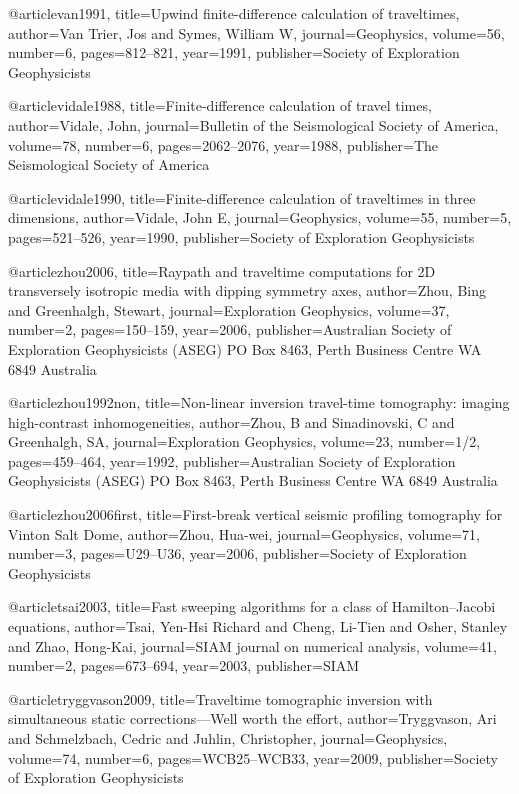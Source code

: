 @article{van1991,
  title={Upwind finite-difference calculation of traveltimes},
  author={Van Trier, Jos and Symes, William W},
  journal={Geophysics},
  volume={56},
  number={6},
  pages={812--821},
  year={1991},
  publisher={Society of Exploration Geophysicists}
}

@article{vidale1988,
  title={Finite-difference calculation of travel times},
  author={Vidale, John},
  journal={Bulletin of the Seismological Society of America},
  volume={78},
  number={6},
  pages={2062--2076},
  year={1988},
  publisher={The Seismological Society of America}
}

@article{vidale1990,
  title={Finite-difference calculation of traveltimes in three dimensions},
  author={Vidale, John E},
  journal={Geophysics},
  volume={55},
  number={5},
  pages={521--526},
  year={1990},
  publisher={Society of Exploration Geophysicists}
}


@article{zhou2006,
  title={Raypath and traveltime computations for 2D transversely isotropic media with dipping symmetry axes},
  author={Zhou, Bing and Greenhalgh, Stewart},
  journal={Exploration Geophysics},
  volume={37},
  number={2},
  pages={150--159},
  year={2006},
  publisher={Australian Society of Exploration Geophysicists (ASEG) PO Box 8463, Perth Business Centre WA 6849 Australia}
}

@article{zhou1992non,
  title={Non-linear inversion travel-time tomography: imaging high-contrast inhomogeneities},
  author={Zhou, B and Sinadinovski, C and Greenhalgh, SA},
  journal={Exploration Geophysics},
  volume={23},
  number={1/2},
  pages={459--464},
  year={1992},
  publisher={Australian Society of Exploration Geophysicists (ASEG) PO Box 8463, Perth Business Centre WA 6849 Australia}
}


@article{zhou2006first,
  title={First-break vertical seismic profiling tomography for Vinton Salt Dome},
  author={Zhou, Hua-wei},
  journal={Geophysics},
  volume={71},
  number={3},
  pages={U29--U36},
  year={2006},
  publisher={Society of Exploration Geophysicists}
}

@article{tsai2003,
  title={Fast sweeping algorithms for a class of Hamilton--Jacobi equations},
  author={Tsai, Yen-Hsi Richard and Cheng, Li-Tien and Osher, Stanley and Zhao, Hong-Kai},
  journal={SIAM journal on numerical analysis},
  volume={41},
  number={2},
  pages={673--694},
  year={2003},
  publisher={SIAM}
}

@article{tryggvason2009,
  title={Traveltime tomographic inversion with simultaneous static corrections—Well worth the effort},
  author={Tryggvason, Ari and Schmelzbach, Cedric and Juhlin, Christopher},
  journal={Geophysics},
  volume={74},
  number={6},
  pages={WCB25--WCB33},
  year={2009},
  publisher={Society of Exploration Geophysicists}
}

